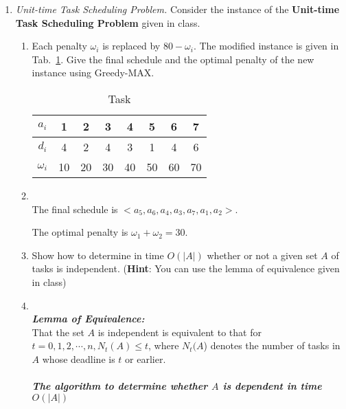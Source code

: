 \documentclass[12pt,a4paper]{article}
\makeatletter
\newtheorem*{solution}{Solution}
\theoremstyle{definition}
\renewenvironment{solution}[1][Solution] {\par\pushQED{\qed}\normalfont\topsep6\p@\@plus6\p@\relax\trivlist\item[\hskip\labelsep\bfseries#1\@addpunct{.}]\ignorespaces}{\popQED\endtrivlist\@endpefalse} \makeatother
\makeatother
\begin{document}
\begin{enumerate}
\begin{enumerate}
\end{enumerate}
\item \textit{Unit-time Task Scheduling Problem.} Consider the instance of the \textbf{Unit-time Task Scheduling Problem} given in class. 
    \begin{enumerate}
        \item Each penalty $\omega_{i}$ is replaced by $80-\omega_{i}$. The modified instance is given in Tab.~\ref{tab:1}. Give the final schedule and the optimal penalty of the new instance using Greedy-MAX.
		\begin{table}[H]
			\setlength{\abovecaptionskip}{0.cm}
			\setlength{\belowcaptionskip}{0.5cm}
			\centering
			\caption{Task}
			\label{tab:1}			
			\begin{tabular}{|c|ccccccc|}
				\hline
				$ a_{i} $&1&2&3&4&5&6&7\\
				\hline
				$ d_{i} $&4&2&4&3&1&4&6\\
                \hline
                $ \omega_{i} $&10&20&30&40&50&60&70\\
				\hline
			\end{tabular}
		\end{table}
	        \begin{solution}
	        ~\\
	            The final schedule is $<a_5,a_6,a_4,a_3,a_7,a_1,a_2>$.
	            
	            The optimal penalty is $\omega_1+\omega_2=30$.
	       
	        \end{solution}
        \item Show how to determine in time $O(|A|)$ whether or not a given set $A$ of tasks is independent. (\textbf{Hint}: You can use the lemma of equivalence given in class)
 	        \begin{solution}
 	        ~\\
			\textbf{\textit{Lemma of Equivalence:}} \\
			That the set $A$ is independent is equivalent to that for $t=0,1,2,\cdots,n,N_t(A)\leq t$, where $N_t(A$) denotes the number of tasks in $A$ whose deadline is $t$ or earlier.
			\\
			\\
			\textbf{\textit{The algorithm to determine whether $A$ is dependent in time $O(|A|)$}}\\
			\begin{algorithm}[H]
			

\end{algorithm}
\end{solution}
\end{enumerate}
\end{enumerate}
\end{document}
